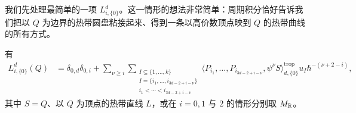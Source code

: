 我们先处理最简单的一项 $L^d_{i,\{0\}}$。这一情形的想法非常简单：周期积分恰好告诉我们把以 $Q$ 为边界的热带圆盘粘接起来、得到一条以高价数顶点映到 $Q$ 的热带曲线的所有方式。

\begin{lemma}
有
\[
  \begin{aligned}
    L^d_{i,\{0\}}(Q)
    &=\delta_{0,d}\delta_{0,i}
      +\sum_{\nu\ge i}\sum_{\substack{I\subseteq\{1,\ldots,k\}\\ I=\{i_1,\ldots,i_{3d-2+i-\nu}\}\\ i_1<\cdots<i_{3d-2+i-\nu}}}
      \langle P_{i_1},\ldots,P_{i_{3d-2+i-\nu}},\psi^\nu S\rangle^{\mathrm{trop}}_{d,\{0\}}u_I\hbar^{-(\nu+2-i)},
  \end{aligned}
\]
其中 $S=Q$、以 $Q$ 为顶点的热带直线 $L$，或在 $i=0,1$ 与 $2$ 的情形分别取 $M_{\mathbb{R}}$。
\end{lemma}


